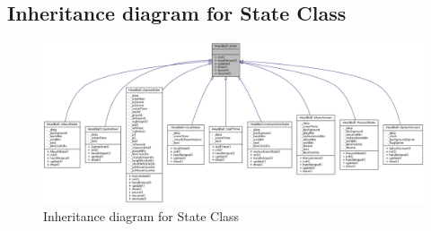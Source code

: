 \documentclass[main]{subfiles}
\begin{document}
\subsection{Inheritance diagram for State Class}
\begin{figure}[H]
    \centering
    \includegraphics[scale=0.275]{graphics/UML_diagrams/state_hierarchy_full.png}
    \caption{Inheritance diagram for State Class}
    \label{fig:state_hierarchy_full}
\end{figure}
\end{document}
